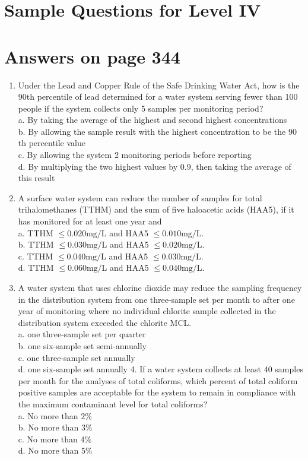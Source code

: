 \documentclass[10pt]{article}
\begin{document}
\section{Sample Questions for Level IV}
\section{Answers on page 344}
\begin{enumerate}
  \item Under the Lead and Copper Rule of the Safe Drinking Water Act, how is the 90th percentile of lead determined for a water system serving fewer than 100 people if the system collects only 5 samples per monitoring period?\\
a. By taking the average of the highest and second highest concentrations\\
b. By allowing the sample result with the highest concentration to be the 90 th percentile value\\
c. By allowing the system 2 monitoring periods before reporting\\
d. By multiplying the two highest values by $0.9$, then taking the average of this result

  \item A surface water system can reduce the number of samples for total trihalomethanes (TTHM) and the sum of five haloacetic acids (HAA5), if it has monitored for at least one year and\\
a. TTHM $\leq 0.020 \mathrm{mg} / \mathrm{L}$ and HAA5 $\leq 0.010 \mathrm{mg} / \mathrm{L}$.\\
b. TTHM $\leq 0.030 \mathrm{mg} / \mathrm{L}$ and HAA5 $\leq 0.020 \mathrm{mg} / \mathrm{L}$.\\
c. TTHM $\leq 0.040 \mathrm{mg} / \mathrm{L}$ and HAA5 $\leq 0.030 \mathrm{mg} / \mathrm{L}$.\\
d. TTHM $\leq 0.060 \mathrm{mg} / \mathrm{L}$ and HAA5 $\leq 0.040 \mathrm{mg} / \mathrm{L}$.

  \item A water system that uses chlorine dioxide may reduce the sampling frequency in the distribution system from one three-sample set per month to after one year of monitoring where no individual chlorite sample collected in the distribution system exceeded the chlorite MCL.\\
a. one three-sample set per quarter\\
b. one six-sample set semi-annually\\
c. one three-sample set annually\\
d. one six-sample set annually 4. If a water system collects at least 40 samples per month for the analyses of total coliforms, which percent of total coliform positive samples are acceptable for the system to remain in compliance with the maximum contaminant level for total coliforms?\\
a. No more than $2 \%$\\
b. No more than $3 \%$\\
c. No more than $4 \%$\\
d. No more than $5 \%$


\end{enumerate}
\end{document}
